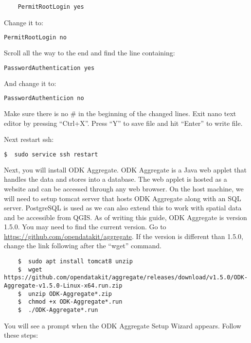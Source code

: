 \begin{lstlisting}
	PermitRootLogin yes
\end{lstlisting}

Change it to:

\begin{lstlisting}[language=bash]
	PermitRootLogin no
\end{lstlisting}

Scroll all the way to the end and find the line containing:

\begin{lstlisting}[language=bash]
	PasswordAuthentication yes
\end{lstlisting}

And change it to:

\begin{lstlisting}[language=bash]
	PasswordAuthenticion no
\end{lstlisting}

Make sure there is no \# in the beginning of the changed lines. Exit nano text editor by pressing ``Ctrl+X''. Press ``Y'' to save file and hit ``Enter'' to write file.

Next restart ssh:

\begin{lstlisting}[language=bash]
	$  sudo service ssh restart
\end{lstlisting}

Next, you will install ODK Aggregate. ODK Aggregate is a Java web applet that handles the data and stores into a database. The web applet is hosted as a website and can be accessed through any web browser. On the host machine, we will need to setup tomcat server that hosts ODK Aggregate along with an SQL server. PostgreSQL is used as we can also extend this to work with spatial data and be accessible from QGIS. As of writing this guide, ODK Aggregate is version 1.5.0. You may need to find the current version. Go to \url{https://github.com/opendatakit/aggregate}. If the version is different than 1.5.0, change the link following after the ``wget'' command.

\begin{lstlisting}
	$  sudo apt install tomcat8 unzip
	$  wget https://github.com/opendatakit/aggregate/releases/download/v1.5.0/ODK-Aggregate-v1.5.0-Linux-x64.run.zip
	$  unzip ODK-Aggregate*.zip
	$  chmod +x ODK-Aggregate*.run
	$  ./ODK-Aggregate*.run
\end{lstlisting}

You will see a prompt when the ODK Aggregate Setup Wizard appears. Follow these steps:

